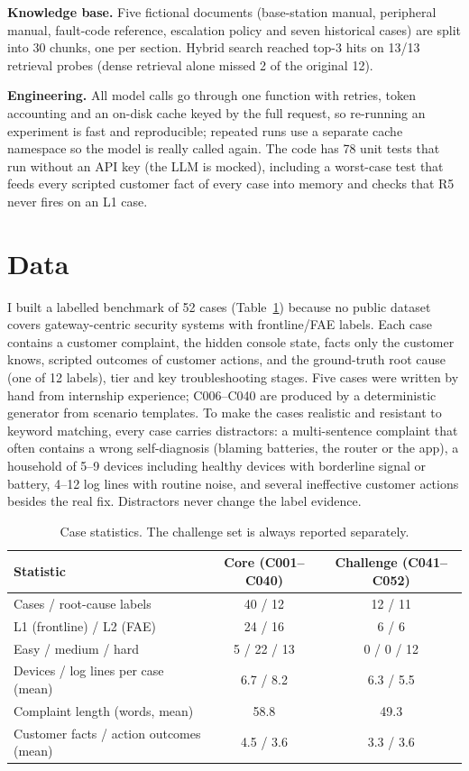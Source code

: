 \documentclass[12pt,a4paper]{article}
\begin{document}
\textbf{Knowledge base.} Five fictional documents (base-station manual, peripheral manual, fault-code reference,
escalation policy and seven historical cases) are split into 30 chunks, one per section. Hybrid search reached
top-3 hits on 13/13 retrieval probes (dense retrieval alone missed 2 of the original 12).

\textbf{Engineering.} All model calls go through one function with retries, token accounting and an on-disk cache
keyed by the full request, so re-running an experiment is fast and reproducible; repeated runs use a separate
cache namespace so the model is really called again. The code has 78 unit tests that run without an API key (the
LLM is mocked), including a worst-case test that feeds every scripted customer fact of every case into memory and
checks that R5 never fires on an L1 case.

\section{Data}
I built a labelled benchmark of 52 cases (Table~\ref{tab:data}) because no public dataset covers gateway-centric
security systems with frontline/FAE labels. Each case contains a customer complaint, the hidden console state, facts
only the customer knows, scripted outcomes of customer actions, and the ground-truth root cause (one of 12 labels),
tier and key troubleshooting stages. Five cases were written by hand from internship experience; C006--C040 are
produced by a deterministic generator from scenario templates. To make the cases realistic and resistant to
keyword matching, every case carries distractors: a multi-sentence complaint that often contains a wrong
self-diagnosis (blaming batteries, the router or the app), a household of 5--9 devices including healthy devices
with borderline signal or battery, 4--12 log lines with routine noise, and several ineffective customer actions
besides the real fix. Distractors never change the label evidence.

\begin{table}[t]
\centering\small
\caption{Case statistics. The challenge set is always reported separately.}\label{tab:data}
\begin{tabular}{@{}lcc@{}}
\toprule
Statistic & Core (C001--C040) & Challenge (C041--C052) \\
\midrule
Cases / root-cause labels & 40 / 12 & 12 / 11 \\
L1 (frontline) / L2 (FAE) & 24 / 16 & 6 / 6 \\
Easy / medium / hard & 5 / 22 / 13 & 0 / 0 / 12 \\
Devices / log lines per case (mean) & 6.7 / 8.2 & 6.3 / 5.5 \\
Complaint length (words, mean) & 58.8 & 49.3 \\
Customer facts / action outcomes (mean) & 4.5 / 3.6 & 3.3 / 3.6 \\
\bottomrule
\end{tabular}
\end{table}
\end{document}
